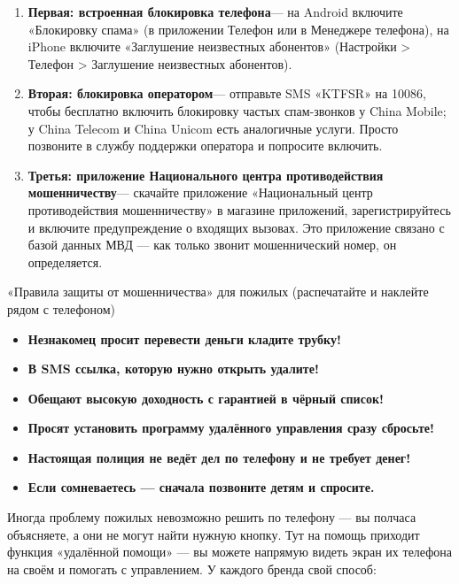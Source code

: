 
\begin{enumerate}
  \item \textbf{Первая: встроенная блокировка телефона}— на Android включите «Блокировку спама» (в приложении Телефон или в Менеджере телефона), на iPhone включите «Заглушение неизвестных абонентов» (Настройки > Телефон > Заглушение неизвестных абонентов).
  \item \textbf{Вторая: блокировка оператором}— отправьте SMS «KTFSR» на 10086, чтобы бесплатно включить блокировку частых спам-звонков у China Mobile; у China Telecom и China Unicom есть аналогичные услуги. Просто позвоните в службу поддержки оператора и попросите включить.
  \item \textbf{Третья: приложение Национального центра противодействия мошенничеству}— скачайте приложение «Национальный центр противодействия мошенничеству» в магазине приложений, зарегистрируйтесь и включите предупреждение о входящих вызовах. Это приложение связано с базой данных МВД — как только звонит мошеннический номер, он определяется.
\end{enumerate}

\begin{tcbwarn}{«Правила защиты от мошенничества» для пожилых (распечатайте и наклейте рядом с телефоном)}
\begin{itemize}
  \item \textbf{Незнакомец просит перевести деньги кладите трубку!}
  \item \textbf{В SMS ссылка, которую нужно открыть удалите!}
  \item \textbf{Обещают высокую доходность с гарантией в чёрный список!}
  \item \textbf{Просят установить программу удалённого управления сразу сбросьте!}
  \item \textbf{Настоящая полиция не ведёт дел по телефону и не требует денег!}
  \item \textbf{Если сомневаетесь — сначала позвоните детям и спросите.}
\end{itemize}

\end{tcbwarn}


Иногда проблему пожилых невозможно решить по телефону — вы полчаса объясняете, а они не могут найти нужную кнопку. Тут на помощь приходит функция «удалённой помощи» — вы можете напрямую видеть экран их телефона на своём и помогать с управлением. У каждого бренда свой способ:

